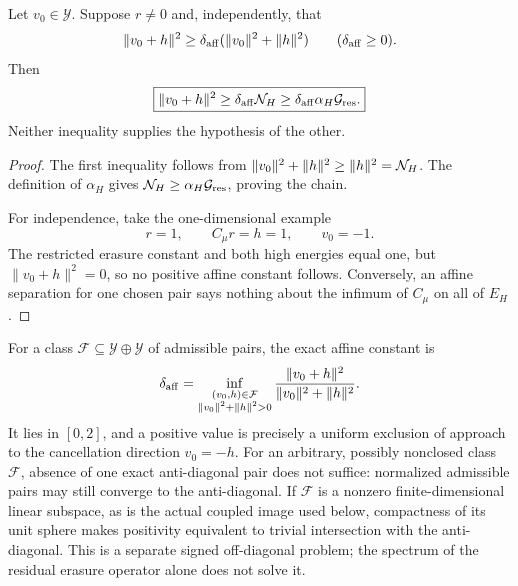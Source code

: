 \begin{proposition}
\label{prop:tpc58-two-independent-gates}
Let \(v_0\in\mathcal Y\).  Suppose \(r\ne0\) and, independently, that
\begin{equation}
 \|v_0+h\|^2
 \ge\delta_{\rm aff}
      (\|v_0\|^2+\|h\|^2)
 \qquad(\delta_{\rm aff}\ge0).
 \label{eq:tpc58-affine-angle-gate}
\end{equation}
Then
\begin{equation}
 \boxed{
 \|v_0+h\|^2
 \ge\delta_{\rm aff}\mathcal N_H
 \ge\delta_{\rm aff}\alpha_H\mathcal G_{\rm res}.}
 \label{eq:tpc58-two-stage-transfer}
\end{equation}
Neither inequality supplies the hypothesis of the other.
\end{proposition}

\begin{proof}
The first inequality follows from
\(\|v_0\|^2+\|h\|^2\ge\|h\|^2=\mathcal N_H\).  The definition of
\(\alpha_H\) gives
\(\mathcal N_H\ge\alpha_H\mathcal G_{\rm res}\), proving the chain.

For independence, take the one-dimensional example
\begin{equation}
 r=1,
 \qquad C_\mu r=h=1,
 \qquad v_0=-1.
 \label{eq:tpc58-independent-gate-counterexample}
\end{equation}
The restricted erasure constant and both high energies equal one, but
\(\|v_0+h\|^2=0\), so no positive affine constant follows.  Conversely,
an affine separation for one chosen pair says nothing about the infimum of
\(C_\mu\) on all of \(E_H\).
\end{proof}

For a class \(\mathcal F\subseteq\mathcal Y\oplus\mathcal Y\) of
admissible pairs, the exact affine constant is
\begin{equation}
 \delta_{\rm aff}
 =\inf_{\substack{(v_0,h)\in\mathcal F\\
                   \|v_0\|^2+\|h\|^2>0}}
   \frac{\|v_0+h\|^2}{\|v_0\|^2+\|h\|^2}.
 \label{eq:tpc58-exact-affine-constant}
\end{equation}
It lies in \([0,2]\), and a positive value is precisely a uniform exclusion
of approach to the cancellation direction \(v_0=-h\).  For an arbitrary,
possibly nonclosed class \(\mathcal F\), absence of one exact anti-diagonal
pair does not suffice: normalized admissible pairs may still converge to the
anti-diagonal.  If \(\mathcal F\) is a nonzero finite-dimensional linear
subspace, as is the actual coupled image used below, compactness of its unit
sphere makes positivity equivalent to trivial intersection with the
anti-diagonal.  This is a separate signed off-diagonal problem; the spectrum
of the residual erasure operator alone does not solve it.
